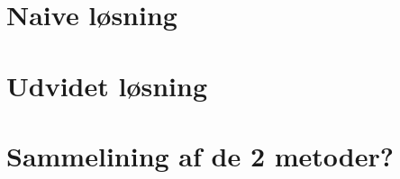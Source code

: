 {\section{Naive løsning}

\clearpage

\section{Udvidet løsning}

\clearpage

\section{Sammelining af de 2 metoder?}

\clearpage


}

